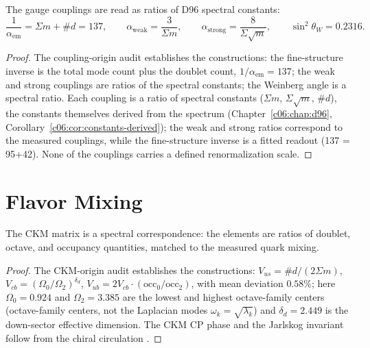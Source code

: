 \begin{theorem}
\label{c11:thm:couplings}
The gauge couplings are read as ratios of D96 spectral constants:
\begin{equation}
\label{c11:eq:couplings}
\frac{1}{\alpha_{\mathrm{em}}} = \Sigma m + \#d = 137,
\qquad
\alpha_{\mathrm{weak}} = \frac{3}{\Sigma m},
\qquad
\alpha_{\mathrm{strong}} = \frac{8}{\Sigma\sqrt{m}},
\qquad
\sin^2\theta_W = 0.2316.
\end{equation}
\end{theorem}

\begin{proof}
The coupling-origin audit \cite{c11:QG162} establishes the constructions: the fine-structure
inverse is the total mode count plus the doublet count, $1/\alpha_{\mathrm{em}} = 137$; the
weak and strong couplings are ratios of the spectral constants; the Weinberg angle is a
spectral ratio. Each coupling is a ratio of spectral constants ($\Sigma m$,
$\Sigma\sqrt{m}$, $\#d$), the constants themselves derived from the spectrum
(Chapter~\ref{c06:chap:d96}, Corollary~\ref{c06:cor:constants-derived}); the weak and
strong ratios correspond to the measured couplings, while the fine-structure inverse is a
fitted readout (137 = 95+42). None of the couplings carries a defined renormalization
scale.
\end{proof}

\section{Flavor Mixing}
\label{c11:sec:mixing}

\begin{theorem}
\label{c11:thm:ckm}
The CKM matrix is a spectral correspondence: the elements are ratios of doublet, octave,
and occupancy quantities, matched to the measured quark mixing.
\end{theorem}

\begin{proof}
The CKM-origin audit \cite{c11:QG165} establishes the constructions:
$V_{us} = \#d/(2\Sigma m)$, $V_{cb} = (\Omega_0/\Omega_2)^{\delta_d}$,
$V_{ub} = 2V_{cb}\cdot(\mathrm{occ}_0/\mathrm{occ}_2)$, with mean deviation $0.58\%$; here
$\Omega_0 = 0.924$ and $\Omega_2 = 3.385$ are the lowest and highest octave-family centers
(octave-family centers, not the Laplacian modes $\omega_k = \sqrt{\lambda_k}$) and
$\delta_d = 2.449$ is the down-sector effective dimension. The
CKM CP phase and the Jarlskog invariant follow from the chiral circulation \cite{c11:QG166}.
\end{proof}

